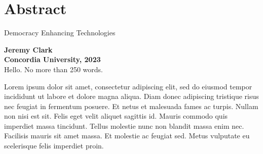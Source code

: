 
\chapter*{\centering Abstract}
\begin{center}
\large{Democracy Enhancing Technologies}
\end{center}


\noindent \textbf{Jeremy Clark}\\
\noindent \textbf{Concordia University, 2023}\\

Hello. No more than 250 words.

Lorem ipsum dolor sit amet, consectetur adipiscing elit, sed do eiusmod tempor incididunt ut labore et dolore magna aliqua. Diam donec adipiscing tristique risus nec feugiat in fermentum posuere. Et netus et malesuada fames ac turpis. Nullam non nisi est sit. Felis eget velit aliquet sagittis id. Mauris commodo quis imperdiet massa tincidunt. Tellus molestie nunc non blandit massa enim nec. Facilisis mauris sit amet massa. Et molestie ac feugiat sed. Metus vulputate eu scelerisque felis imperdiet proin.



